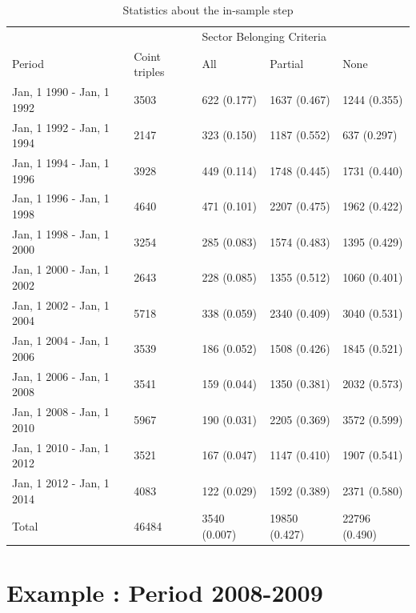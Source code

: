 \documentclass[11pt,a4,twosided,singlespacing,titlepagenumber=on]{scrreprt}
\numberwithin{equation}{chapter} %
\theoremstyle{remark}
\begin{document}
\begin{table}[H]
\centering
\begin{tabular}{lllll}
\hline
                              && \multicolumn{3}{l}{Sector Belonging Criteria}  \\
Period & Coint triples & All & Partial & None \\
\hline
Jan, 1 1990 - Jan, 1 1992 & 3503    & 622 (0.177) & 1637 (0.467) & 1244 (0.355) \\
Jan, 1 1992 - Jan, 1 1994 & 2147    & 323 (0.150) & 1187 (0.552)  & 637 (0.297) \\
Jan, 1 1994 - Jan, 1 1996 & 3928    & 449 (0.114) & 1748 (0.445)  & 1731 (0.440) \\
Jan, 1 1996 - Jan, 1 1998 & 4640    & 471 (0.101) & 2207 (0.475)  & 1962 (0.422) \\
Jan, 1 1998 - Jan, 1 2000 & 3254    & 285 (0.083) & 1574 (0.483)  & 1395 (0.429) \\
Jan, 1 2000 - Jan, 1 2002 & 2643    & 228 (0.085) & 1355 (0.512)  & 1060 (0.401)\\
Jan, 1 2002 - Jan, 1 2004 & 5718    & 338 (0.059) & 2340 (0.409)  & 3040 (0.531) \\
Jan, 1 2004 - Jan, 1 2006 & 3539    & 186 (0.052) & 1508 (0.426)  & 1845 (0.521) \\
Jan, 1 2006 - Jan, 1 2008 & 3541    & 159 (0.044) & 1350 (0.381)  & 2032 (0.573) \\
Jan, 1 2008 - Jan, 1 2010 & 5967    & 190 (0.031) & 2205 (0.369)  & 3572 (0.599) \\
Jan, 1 2010 - Jan, 1 2012 & 3521    & 167 (0.047) & 1147 (0.410)  & 1907 (0.541) \\
Jan, 1 2012 - Jan, 1 2014 & 4083    & 122 (0.029) & 1592 (0.389)  & 2371 (0.580) \\
\hline
Total & 46484 & 3540 (0.007) & 19850 (0.427) & 22796 (0.490) \\
\hline
\end{tabular}
\caption{Statistics about the in-sample step}
\end{table}

\section{Example : Period 2008-2009}
\end{document}
